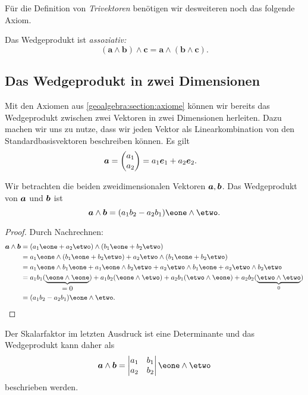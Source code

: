 Für die Definition von \emph{Trivektoren} benötigen wir desweiteren noch das folgende Axiom.
\begin{axiom}
  Das Wedgeprodukt ist \em{assoziativ}:
%
  \begin{equation*}
    (\boldsymbol{a} \wedge \boldsymbol{b}) \wedge \boldsymbol{c} = \boldsymbol{a} \wedge (\boldsymbol{b} \wedge \boldsymbol{c}).
  \end{equation*}
\end{axiom}

\subsection{Das Wedgeprodukt in zwei Dimensionen}
\renewcommand{\subsectionautorefname}{Abschnitt}
Mit den Axiomen aus \autoref{geoalgebra:section:axiome} können wir bereits das Wedgeprodukt zwischen zwei
Vektoren in zwei Dimensionen herleiten.
Dazu machen wir uns zu nutze, dass wir jeden Vektor als
Linearkombination von den Standardbasisvektoren beschreiben können.
Es gilt
\begin{align}
  \boldsymbol{a} &= \begin{pmatrix} a_1 \\ a_2 \end{pmatrix} = a_1 \boldsymbol{e}_1 + a_2 \boldsymbol{e}_2.
\end{align}

\begin{lemma}
  Wir betrachten die beiden zweidimensionalen Vektoren $\boldsymbol{a},
  \boldsymbol{b}$.
  Das Wedgeprodukt von $\boldsymbol{a}$ und $\boldsymbol{b}$ ist
\begin{equation*}
    \a \wedge \b 
    = (a_1 b_2 - a_2 b_1) \eone \wedge \etwo.
\end{equation*}
\end{lemma}

\begin{proof}
Durch Nachrechnen:
  \begin{align*}
    \a \wedge \b &= (a_1 \eone + a_2 \etwo) \wedge
    (b_1 \eone + b_2 \etwo)
\\
    &= a_1 \eone \wedge (b_1 \eone + b_2 \etwo) + a_2 \etwo \wedge (b_1 \eone + b_2 \etwo)
\\
    &= a_1 \eone \wedge b_1 \eone + a_1 \eone \wedge b_2 \etwo + a_2 \etwo \wedge b_1 \eone + a_2 \etwo \wedge b_2 \etwo
\\
    &= a_1 b_1 (\underbrace{\eone \wedge \eone}_{\displaystyle=0}) + a_1 b_2 (\eone \wedge \etwo) + a_2 b_1 (\etwo \wedge \eone) + a_2 b_2 (\underbrace{\etwo \wedge \etwo}_{0})
\\
    &= (a_1 b_2 - a_2 b_1) \eone \wedge \etwo.
\qedhere
    \end{align*}
\end{proof}
Der Skalarfaktor im letzten Ausdruck ist eine Determinante und das
Wedgeprodukt kann daher als
\begin{equation}
    \a \wedge \b
=
  \begin{vmatrix}
    a_1 & b_1 \\
    a_2 & b_2
  \end{vmatrix}
  \eone \wedge \etwo
    \label{geoalgebra:eq:2d-wedgeproduct}
\end{equation}
beschrieben werden.

